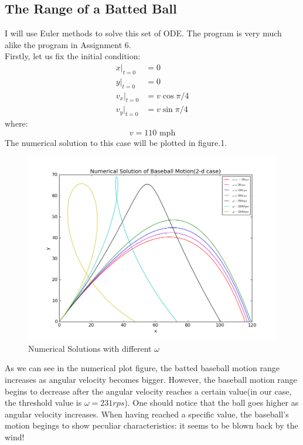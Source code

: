 \documentclass[10pt,a4paper]{article}
\begin{document}
    \subsection{The Range of a Batted Ball}
    I will use Euler methods to solve this set of ODE. The program is very much alike the program in Assignment 6. \\
    Firstly, let us fix the initial condition:
    \begin{align}
    x|_{t=0}&=0\\
    y|_{t=0}&=0\\
    v_x|_{t=0}&=v\cos{\pi/4}\\
    v_y|_{t=0}&=v\sin{\pi/4}
    \end{align}
    where:
    \begin{equation}
    v=110\text{ mph}
    \end{equation}     
    The numerical solution to this case will be plotted in figure.1.
    \begin{figure}[htbp]
    	\centering
    	\includegraphics[width=5in]{baseball_1.png}
    	\caption{Numerical Solutions with different $\omega$}
    \end{figure}
    As we can see in the numerical plot figure, the batted baseball motion range increases as angular velocity becomes bigger. However, the baseball motion range begins to decrease after the angular velocity reaches a certain value(in our case, the threshold value is $\omega=231rps$). One should notice that the ball goes higher as angular velocity increases. When having reached a specific value, the baseball's motion begings to show peculiar characteristics: it seems to be blown back by the wind!\\
\end{document}
